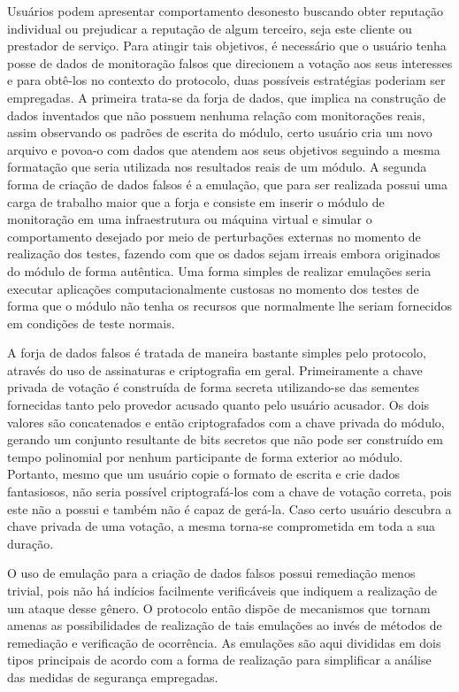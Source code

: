 %
Usuários podem apresentar comportamento desonesto buscando obter reputação individual ou prejudicar a reputação de algum terceiro, seja este cliente ou prestador de serviço. Para atingir tais objetivos, é necessário que o usuário tenha posse de dados de monitoração falsos que direcionem a votação aos seus interesses e para obtê-los no contexto do protocolo, duas possíveis estratégias poderiam ser empregadas. A primeira trata-se da forja de dados, que implica na construção de dados inventados que não possuem nenhuma relação com monitorações reais, assim observando os padrões de escrita do módulo, certo usuário cria um novo arquivo e povoa-o com dados que atendem aos seus objetivos seguindo a mesma formatação que seria utilizada nos resultados reais de um módulo. A segunda forma de criação de dados falsos é a emulação, que para ser realizada possui uma carga de trabalho maior que a forja e consiste em inserir o módulo de monitoração em uma infraestrutura ou máquina virtual e simular o comportamento desejado por meio de perturbações externas no momento de realização dos testes, fazendo com que os dados sejam irreais embora originados do módulo de forma autêntica. Uma forma simples de realizar emulações seria executar aplicações computacionalmente custosas no momento dos testes de forma que o módulo não tenha os recursos que normalmente lhe seriam fornecidos em condições de teste normais.

%
A forja de dados falsos é tratada de maneira bastante simples pelo protocolo, através do uso de assinaturas e criptografia em geral. Primeiramente a chave privada de votação é construída de forma secreta utilizando-se das sementes fornecidas tanto pelo provedor acusado quanto pelo usuário acusador. Os dois valores são concatenados e então criptografados com a chave privada do módulo, gerando um conjunto resultante de bits secretos que não pode ser construído em tempo polinomial por nenhum participante de forma exterior ao módulo. Portanto, mesmo que um usuário copie o formato de escrita e crie dados fantasiosos, não seria possível criptografá-los com a chave de votação correta, pois este não a possui e também não é capaz de gerá-la. Caso certo usuário descubra a chave privada de uma votação, a mesma torna-se comprometida em toda a sua duração.

%
O uso de emulação para a criação de dados falsos possui remediação menos trivial, pois não há indícios facilmente verificáveis que indiquem a realização de um ataque desse gênero. O protocolo então dispõe de mecanismos que tornam amenas as possibilidades de realização de tais emulações ao invés de métodos de remediação e verificação de ocorrência. As emulações são aqui divididas em dois tipos principais de acordo com a forma de realização para simplificar a análise das medidas de segurança empregadas.

